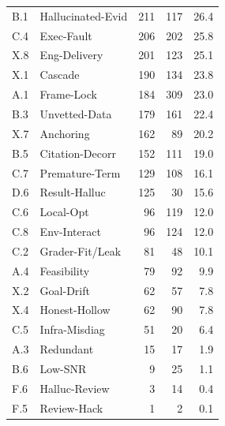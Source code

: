 \begin{longtable}{llrrr}
B.1 & Hallucinated-Evid & 211 & 117 & 26.4 \\
C.4 & Exec-Fault & 206 & 202 & 25.8 \\
X.8 & Eng-Delivery & 201 & 123 & 25.1 \\
X.1 & Cascade & 190 & 134 & 23.8 \\
A.1 & Frame-Lock & 184 & 309 & 23.0 \\
B.3 & Unvetted-Data & 179 & 161 & 22.4 \\
X.7 & Anchoring & 162 & 89 & 20.2 \\
B.5 & Citation-Decorr & 152 & 111 & 19.0 \\
C.7 & Premature-Term & 129 & 108 & 16.1 \\
D.6 & Result-Halluc & 125 & 30 & 15.6 \\
C.6 & Local-Opt & 96 & 119 & 12.0 \\
C.8 & Env-Interact & 96 & 124 & 12.0 \\
C.2 & Grader-Fit/Leak & 81 & 48 & 10.1 \\
A.4 & Feasibility & 79 & 92 & 9.9 \\
X.2 & Goal-Drift & 62 & 57 & 7.8 \\
X.4 & Honest-Hollow & 62 & 90 & 7.8 \\
C.5 & Infra-Misdiag & 51 & 20 & 6.4 \\
A.3 & Redundant & 15 & 17 & 1.9 \\
B.6 & Low-SNR & 9 & 25 & 1.1 \\
F.6 & Halluc-Review & 3 & 14 & 0.4 \\
F.5 & Review-Hack & 1 & 2 & 0.1 \\
\end{longtable}

